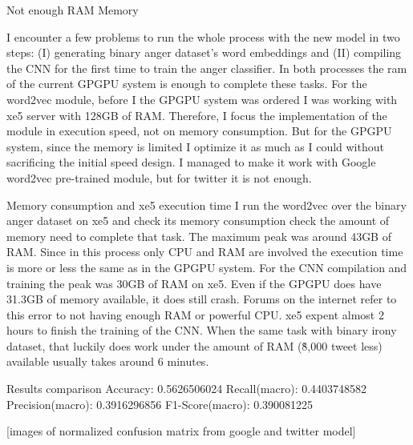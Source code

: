 Not enough RAM Memory

I encounter a few problems to run the whole process with the new model in two steps: (I) generating binary anger dataset’s word embeddings and (II) compiling the CNN for the first time to train the anger classifier. In both processes the ram of the current GPGPU system is enough to complete these tasks. 
For the word2vec module, before I the GPGPU system was ordered I was working with xe5 server with 128GB of RAM. Therefore, I focus the implementation of the module in execution speed, not on memory consumption. But for the GPGPU system, since the memory is limited I optimize it as much as I could without sacrificing the initial speed design. I managed to make it work with Google word2vec pre-trained module, but for twitter it is not enough.

Memory consumption and xe5 execution time
I run the word2vec over the binary anger dataset on xe5 and check its memory consumption check the amount of memory need to complete that task. The maximum peak was around 43GB of RAM. Since in this process only CPU and RAM are involved the execution time is more or less the same as in the GPGPU system.
For the CNN compilation and training the peak was 30GB of RAM on xe5. Even if the GPGPU does have 31.3GB of memory available, it does still crash. Forums on the internet refer to this error to not having enough RAM or powerful CPU. xe5 expent almost 2 hours to finish the training of the CNN. When the same task with binary irony dataset, that luckily does work under the amount of RAM (\~8,000 tweet less) available usually takes around 6 minutes.

Results comparison
Accuracy: 0.5626506024
Recall(macro): 0.4403748582
Precision(macro): 0.3916296856
F1-Score(macro): 0.390081225

[images of normalized confusion matrix from google and twitter model]

\fi